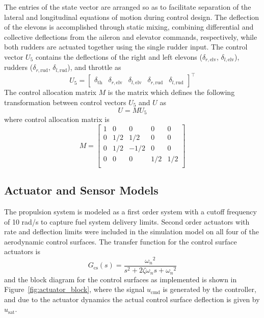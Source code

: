 \documentclass[]{../sty/aiaa-tc}
\begin{document}
  The entries of the state vector are arranged so as to facilitate separation of the lateral and longitudinal equations of motion during control design.
  The deflection of the elevons is accomplished through static mixing, combining differential and collective deflections from the aileron and elevator commands, respectively, while both rudders are actuated together using the single rudder input.
  The control vector $U_{5}$ contains the deflections of the right and left elevons ($\delta_{r,\text{elv}}$, $\delta_{l,\text{elv}}$), rudders ($\delta_{r,\text{rud}}$, $\delta_{l,\text{rud}}$), and throttle as
  \begin{equation*}
    U_{5}=
    \left[
    \begin{array}{ccccc}
      \delta_{\text{th}} & \delta_{r,\text{elv}} & \delta_{l,\text{elv}} & \delta_{r,\text{rud}}  & \delta_{l,\text{rud}}
    \end{array}\right]^{\top}
  \end{equation*}
  The control allocation matrix $M$ is the matrix which defines the following transformation between control vectors $U_{5}$ and $U$ as
  \begin{equation*}
    U=MU_{5}
  \end{equation*}
  where control allocation matrix is
  \begin{equation*}
    M=
    \left[
    \begin{array}{ccccc}
      1 & 0 & 0 & 0 & 0 \\
      0 & 1/2 & 1/2 & 0 & 0 \\
      0 & 1/2 & -1/2 & 0 & 0 \\
      0 & 0 & 0 & 1/2 & 1/2 \\
    \end{array}\right]
  \end{equation*}

  \subsection{Actuator and Sensor Models}

  The propulsion system is modeled as a first order system with a cutoff frequency of 10 rad/s to capture fuel system delivery limits.
  Second order actuators with rate and deflection limits were included in the simulation model on all four of the aerodynamic control surfaces.
  The transfer function for the control surface actuators is
  \begin{equation*}
    G_{\text{cs}}(s)=\frac{{\omega_{n}}^{2}}{s^{2}+2\zeta\omega_{n}s+{\omega_{n}}^{2}}
  \end{equation*}
  and the block diagram for the control surfaces as implemented is shown in Figure~\ref{fig:actuator_block}, where the signal $u_{\text{cmd}}$ is generated by the controller, and due to the actuator dynamics the actual control surface deflection is given by $u_{\text{sat}}$.
\end{document}
